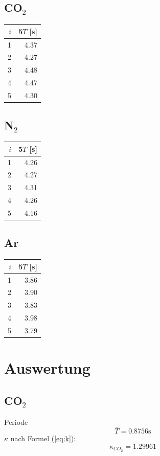 \documentclass[12pt,a4paper]{article}
\begin{document}
\begin{multicols}{3}
\subsection*{CO$_2$}
\begin{tabular}{|r|r|}
\hline
$i$&5$T$ [s]\\
\hline
1&4.37 \\
2&4.27 \\
3&4.48 \\
4&4.47 \\
5&4.30 \\
\hline
\end{tabular}

\subsection*{N$_2$}
\begin{tabular}{|r|r|}
\hline
$i$&5$T$ [s]\\
\hline
1&4.26 \\
2&4.27 \\
3&4.31 \\
4&4.26 \\
5&4.16 \\
\hline
\end{tabular}

\subsection*{Ar}
\begin{tabular}{|r|r|}
\hline
$i$&5$T$ [s]\\
\hline
1&3.86 \\
2&3.90 \\
3&3.83 \\
4&3.98 \\
5&3.79 \\
\hline
\end{tabular}
\end{multicols}

\section*{Auswertung}
\subsection*{CO$_2$}
Periode
\[ \overline{T} = 0.8756\mbox{s} \]
$\kappa$ nach Formel (\ref{eq:k}):
\[ \kappa_{CO_2} = 1.29961 \]
\end{document}

